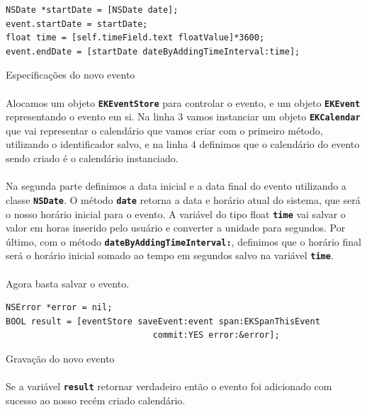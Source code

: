 \documentclass[a4paper,12pt,brazil,doubleside]{book}
\begin{document}
\begin{singlespace}
\begin{listing}[H]
\begin{verbatim}
NSDate *startDate = [NSDate date];
event.startDate = startDate;
float time = [self.timeField.text floatValue]*3600;
event.endDate = [startDate dateByAddingTimeInterval:time];
\end{verbatim}
\caption{Especificações do novo evento}
\end{listing}

\paragraph{}Alocamos um objeto \texttt{\textbf{EKEventStore}} para controlar o evento, e um objeto \texttt{\textbf{EKEvent}} representando o evento em si. Na linha 3 vamos instanciar um objeto \texttt{\textbf{EKCalendar}} que vai representar o calendário que vamos criar com o primeiro método, utilizando o identificador salvo, e na linha 4 definimos que o calendário do evento sendo criado é o calendário instanciado.
\paragraph{}Na segunda parte definimos a data inicial e a data final do evento utilizando a classe \texttt{\textbf{NSDate}}. O método \texttt{\textbf{date}} retorna a data e horário atual do sistema, que será o nosso horário inicial para o evento. A variável do tipo float \texttt{\textbf{time}} vai salvar o valor em horas inserido pelo usuário e converter a unidade para segundos. Por último, com o método \texttt{\textbf{dateByAddingTimeInterval:}}, definimos que o horário final será o horário inicial somado ao tempo em segundos salvo na variável \texttt{\textbf{time}}.
\paragraph{}Agora basta salvar o evento.

\begin{listing}[H]
\begin{verbatim}
NSError *error = nil;
BOOL result = [eventStore saveEvent:event span:EKSpanThisEvent
                             commit:YES error:&error];
\end{verbatim}
\caption{Gravação do novo evento}
\end{listing}

\paragraph{}Se a variável \texttt{\textbf{result}} retornar verdadeiro então o evento foi adicionado com sucesso ao nosso recém criado calendário.


\end{singlespace}
\end{document}

